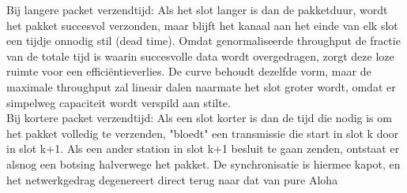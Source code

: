 Bij langere packet verzendtijd: Als het slot langer is dan de pakketduur, wordt het pakket succesvol verzonden, maar blijft het kanaal aan het einde van elk slot een tijdje onnodig stil (dead time). Omdat genormaliseerde throughput de fractie van de totale tijd is waarin succesvolle data wordt overgedragen, zorgt deze loze ruimte voor een efficiëntieverlies. De curve behoudt dezelfde vorm, maar de maximale throughput zal lineair dalen naarmate het slot groter wordt, omdat er simpelweg capaciteit wordt verspild aan stilte.\\

Bij kortere packet verzendtijd: Als een slot korter is dan de tijd die nodig is om het pakket volledig te verzenden, "bloedt" een transmissie die start in slot k door in slot k+1. Als een ander station in slot k+1 besluit te gaan zenden, ontstaat er alsnog een botsing halverwege het pakket. De synchronisatie is hiermee kapot, en het netwerkgedrag degenereert direct terug naar dat van pure Aloha